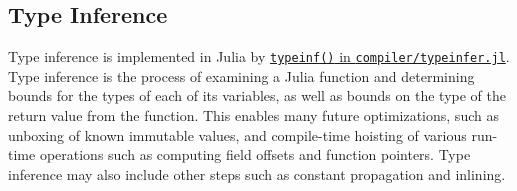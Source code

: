 \hypertarget{5553247398724394157}{}


\subsection{Type Inference}



Type inference is implemented in Julia by \href{https://github.com/JuliaLang/julia/blob/master/base/compiler/typeinfer.jl}{\texttt{typeinf()} in \texttt{compiler/typeinfer.jl}}. Type inference is the process of examining a Julia function and determining bounds for the types of each of its variables, as well as bounds on the type of the return value from the function. This enables many future optimizations, such as unboxing of known immutable values, and compile-time hoisting of various run-time operations such as computing field offsets and function pointers. Type inference may also include other steps such as constant propagation and inlining.



